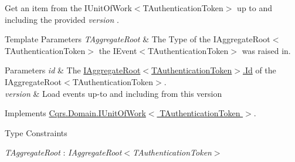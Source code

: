 Get an item from the I\+Unit\+Of\+Work$<$\+T\+Authentication\+Token$>$ up to and including the provided {\itshape version} . 


\begin{DoxyTemplParams}{Template Parameters}
{\em T\+Aggregate\+Root} & The Type of the I\+Aggregate\+Root$<$\+T\+Authentication\+Token$>$ the I\+Event$<$\+T\+Authentication\+Token$>$ was raised in.\\
\hline
\end{DoxyTemplParams}

\begin{DoxyParams}{Parameters}
{\em id} & The \hyperlink{interfaceCqrs_1_1Domain_1_1IAggregateRoot_a04aa3198f1371afa345a58e8fcb713d7_a04aa3198f1371afa345a58e8fcb713d7}{I\+Aggregate\+Root$<$\+T\+Authentication\+Token$>$.\+Id} of the I\+Aggregate\+Root$<$\+T\+Authentication\+Token$>$.\\
\hline
{\em version} & Load events up-\/to and including from this version\\
\hline
\end{DoxyParams}


Implements \hyperlink{interfaceCqrs_1_1Domain_1_1IUnitOfWork_a449dde9a112fcce6aaab0e4c8b3b9a71_a449dde9a112fcce6aaab0e4c8b3b9a71}{Cqrs.\+Domain.\+I\+Unit\+Of\+Work$<$ T\+Authentication\+Token $>$}.

\begin{Desc}
\item[Type Constraints]\begin{description}
\item[{\em T\+Aggregate\+Root} : {\em I\+Aggregate\+Root$<$T\+Authentication\+Token$>$}]\end{description}
\end{Desc}
